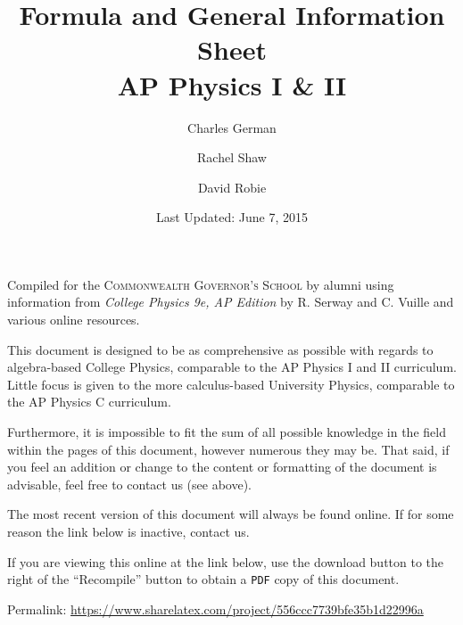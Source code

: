 \documentclass[11pt,letterpaper]{article}%
\title{Formula and General Information Sheet \\ \large{AP Physics I \& II}}
\author{Charles German}\affil{Bridgewater College, \email{cgerman@eagles.bridgewater.edu}}
\author{Rachel Shaw}\affil{University of Virginia, \email{rcs8vq@virginia.edu}}
\author{David Robie}\affil{Virginia Commonwealth University, \email{robiedr@mymail.vcu.edu}} %
\date{Last Updated: June 7, 2015}%
\newcommand{\lcp}{%
  Permalink: \url{https://www.sharelatex.com/project/556ccc7739bfe35b1d22996a}
}
\begin{document}
\maketitle
\thispagestyle{empty}
\begin{center}
	Compiled for the \textsc{Commonwealth Governor's School} by alumni using information from \textit{College Physics 9e, AP Edition} by R. Serway and C. Vuille and various online resources.
\end{center}

\par This document is designed to be as comprehensive as possible with regards to algebra-based College Physics, comparable to the AP Physics I and II curriculum. Little focus is given to the more calculus-based University Physics, comparable to the AP Physics C curriculum. \\

\par Furthermore, it is impossible to fit the sum of all possible knowledge in the field within the pages of this document, however numerous they may be. That said, if you feel an addition or change to the content or formatting of the document is advisable, feel free to contact us (see above). \\

\par The most recent version of this document will always be found online. If for some reason the link below is inactive, contact us. \\

\par If you are viewing this online at the link below, use the download button to the right of the ``Recompile'' button to obtain a \texttt{PDF} copy of this document. \\

\par\lcp 

\clearpage
\tableofcontents

\setlength\parskip{1em}%
\end{document}
